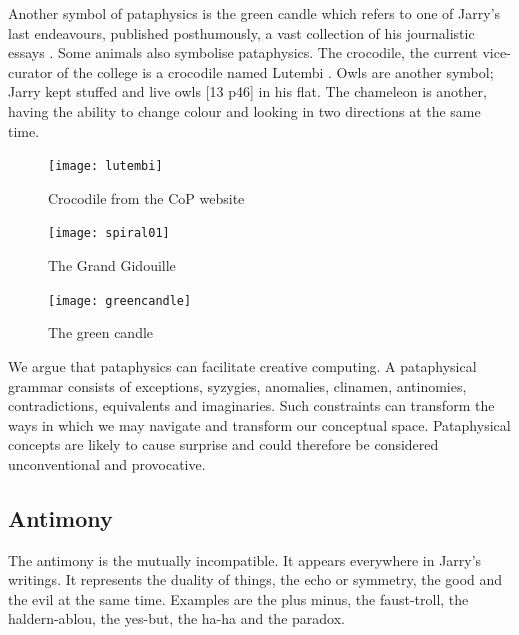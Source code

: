 Another symbol of pataphysics is the green candle which refers to one of Jarry's last endeavours, published posthumously, a vast collection of his journalistic essays \citep{Hugill2012}. Some animals also symbolise pataphysics. The crocodile, the current vice-curator of the college is a crocodile named Lutembi \citep{Hugill2012}. Owls are another symbol; Jarry kept stuffed and live owls \citep[p.46]{Brotchie2011}[13 p46] in his flat. The chameleon is another, having the ability to change colour and looking in two directions at the same time.

\begin{figure}[htb]
  \centering
  \begin{minipage}{.275\linewidth}
    \texttt{[image: lutembi]}
  \caption[Crocodile]{Crocodile from the CoP website}
  \label{img1}
  \end{minipage}
  \hspace{.05\linewidth}
  \begin{minipage}{.275\linewidth}
    \texttt{[image: spiral01]}
  \caption[Gidouille]{The Grand Gidouille}
  \label{img2}
  \end{minipage}
  \hspace{.05\linewidth}
  \begin{minipage}{.275\linewidth}
    \texttt{[image: greencandle]}
  \caption[Green Candle]{The green candle}
  \label{img3}
  \end{minipage}
\end{figure}

\begin{draft}
  We argue that pataphysics can facilitate creative computing. A pataphysical grammar consists of exceptions, syzygies, anomalies, clinamen, antinomies, contradictions, equivalents and imaginaries. Such constraints can transform the ways in which we may navigate and transform our conceptual space. Pataphysical concepts are likely to cause surprise and could therefore be considered unconventional and provocative.
\end{draft}

\subsection{Antimony}

The antimony is the mutually incompatible. It appears everywhere in Jarry's writings. It represents the duality of things, the echo or symmetry, the good and the evil at the same time. Examples are the plus minus, the faust-troll, the haldern-ablou, the yes-but, the ha-ha and the paradox.

